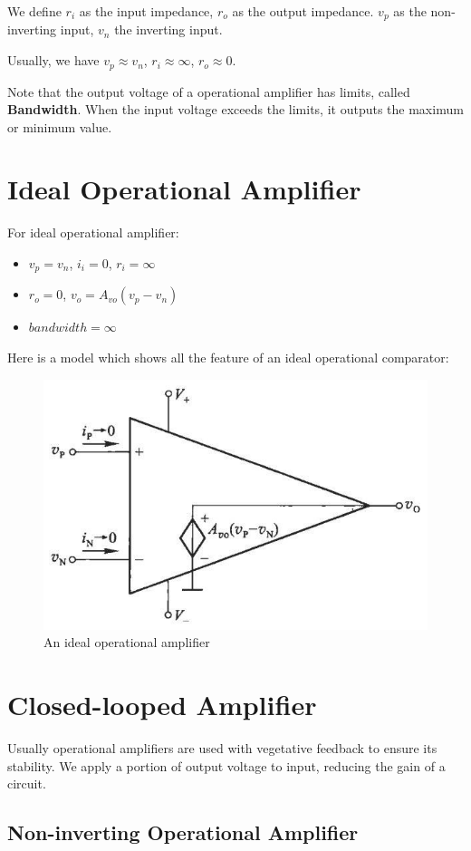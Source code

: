 We define $r_i$ as the input impedance, $r_o$ as the output impedance. $v_p$ as the non-inverting input, $v_n$  the inverting input.

Usually, we have $v_p \approx v_n$, $r_i \approx \infty$, $r_o \approx 0$.

Note that the output voltage of a operational amplifier has limits, called \textbf{Bandwidth}. When the input voltage exceeds the limits, it outputs the maximum or minimum value.

\section{Ideal Operational Amplifier}

For ideal operational amplifier:

\begin{itemize}
\item $v_p = v_n$, $i_i = 0$, $r_i = \infty$
\item $r_o = 0$, $v_o = A_{vo} \left( v_p - v_n \right)$
\item $bandwidth = \infty$
  
\end{itemize}

Here is a model which shows all the feature of an ideal operational comparator:

\begin{figure}[H]
  \centering
  \includegraphics[width=0.5\linewidth]{figures/ideal-comparator}
  \caption{An ideal operational amplifier}
  \label{fig:}
\end{figure}

\section{Closed-looped Amplifier}


Usually operational amplifiers are used with vegetative feedback to ensure its stability. We apply a portion of output voltage to input, reducing the gain of a circuit.

\subsection{Non-inverting Operational Amplifier}

